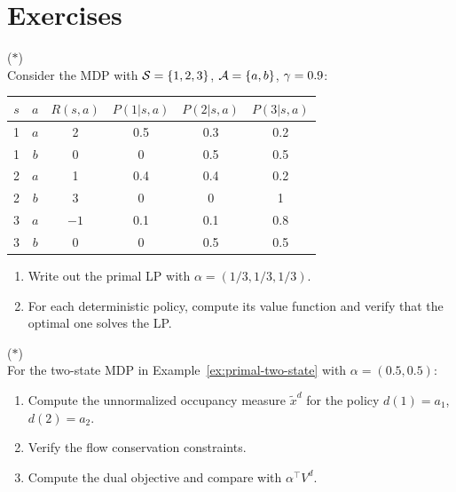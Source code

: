 \documentclass[11pt,a4paper]{article}
\begin{document}

\section{Exercises}
\label{sec:exercises}

\begin{exercise}
\textnormal{(\(*\))} \\
Consider the MDP with $\mathcal{S} = \{1, 2, 3\}$,
$\mathcal{A} = \{a, b\}$, $\gamma = 0.9$:
\begin{center}
\begin{tabular}{cccccc}
\toprule
$s$ & $a$ & $R(s,a)$ & $P(1|s,a)$ & $P(2|s,a)$ & $P(3|s,a)$ \\
\midrule
1 & $a$ & 2 & 0.5 & 0.3 & 0.2 \\
1 & $b$ & 0 & 0 & 0.5 & 0.5 \\
2 & $a$ & 1 & 0.4 & 0.4 & 0.2 \\
2 & $b$ & 3 & 0 & 0 & 1 \\
3 & $a$ & $-1$ & 0.1 & 0.1 & 0.8 \\
3 & $b$ & 0 & 0 & 0.5 & 0.5 \\
\bottomrule
\end{tabular}
\end{center}
\begin{enumerate}[label=(\alph*)]
    \item Write out the primal LP with $\alpha = (1/3, 1/3, 1/3)$.
    \item For each deterministic policy, compute its value function
    and verify that the optimal one solves the LP.
\end{enumerate}
\end{exercise}

\begin{exercise}
\textnormal{(\(*\))} \\
For the two-state MDP in Example~\ref{ex:primal-two-state} with
$\alpha = (0.5, 0.5)$:
\begin{enumerate}[label=(\alph*)]
    \item Compute the unnormalized occupancy measure
    $\tilde{x}^d$ for the policy $d(1) = a_1$, $d(2) = a_2$.
    \item Verify the flow conservation constraints.
    \item Compute the dual objective and compare with
    $\alpha^\top V^d$.
\end{enumerate}
\end{exercise}
\end{document}
